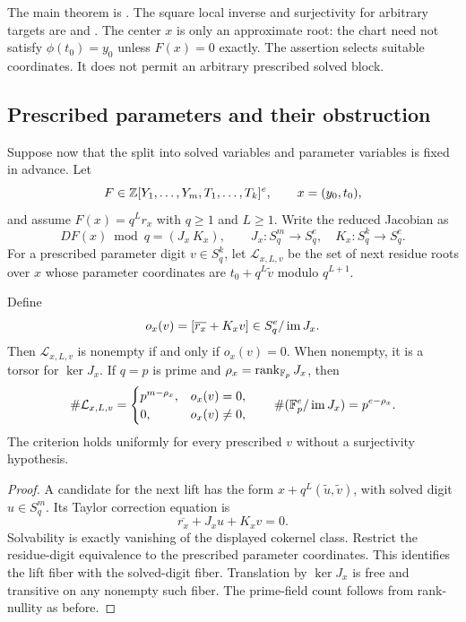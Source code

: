 The main theorem is
.
The square local inverse and surjectivity for arbitrary targets are
 and
.
The center $x$ is only an approximate root: the chart need not satisfy
$\phi(t_0)=y_0$ unless $F(x)=0$ exactly. The assertion selects suitable
coordinates. It does not permit an arbitrary prescribed solved block.

\subsection{Prescribed parameters and their obstruction}

Suppose now that the split into solved variables and parameter variables
is fixed in advance. Let
\[
 F\in\mathbb Z[Y_1,\ldots,Y_m,T_1,\ldots,T_k]^e,\qquad x=(y_0,t_0),
\]
and assume $F(x)=q^Lr_x$ with $q\ge1$ and $L\ge1$. Write the reduced
Jacobian as
\[
 DF(x)\bmod q=(J_x\ K_x),\qquad
 J_x:S_q^m\to S_q^e,\quad K_x:S_q^k\to S_q^e.
\]
For a prescribed parameter digit $v\in S_q^k$, let $\mathcal L_{x,L,v}$
be the set of next residue roots over $x$ whose parameter coordinates are
$t_0+q^L\widetilde v$ modulo $q^{L+1}$.

\begin{theorem}
\label{thm:prescribed-obstruction}
Define
\[
 o_x(v)=[\overline{r_x}+K_xv]\in S_q^e/\operatorname{im} J_x.
\]
Then $\mathcal L_{x,L,v}$ is nonempty if and only if $o_x(v)=0$.
When nonempty, it is a torsor for $\ker J_x$. If $q=p$ is prime and
$\rho_x=\operatorname{rank}_{\mathbb F_p}J_x$, then
\begin{equation}\label{eq:prescribed-count}
 \#\mathcal L_{x,L,v}
 =\begin{cases}p^{m-\rho_x},&o_x(v)=0,\\0,&o_x(v)\ne0,\end{cases}
 \qquad \#(\mathbb F_p^e/\operatorname{im} J_x)=p^{e-\rho_x}.
\end{equation}
The criterion holds uniformly for every prescribed $v$ without a
surjectivity hypothesis.
\end{theorem}

\begin{proof}
A candidate for the next lift has the form
$x+q^L(\widetilde u,\widetilde v)$, with solved digit $u\in S_q^m$.
Its Taylor correction equation is
\[
 \overline{r_x}+J_xu+K_xv=0.
\]
Solvability is exactly vanishing of the displayed cokernel class. Restrict
the residue-digit equivalence to the prescribed parameter coordinates.
This identifies the lift fiber with the solved-digit fiber.
Translation by $\ker J_x$ is free and transitive on any nonempty such
fiber. The prime-field count follows from rank-nullity as before.
\end{proof}

